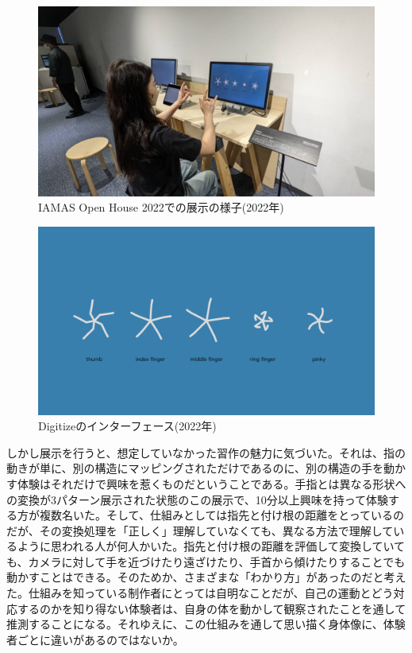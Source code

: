 \begin{figure}[H]
  \centering
  \includegraphics[width=15cm]{img/openhouse2022.jpeg}
  \caption{IAMAS Open House 2022での展示の様子(2022年)}
  \label{fig:exhibit_2022}
\end{figure}

\begin{figure}[H]
  \centering
  \includegraphics[width=15cm]{img/openhouse2022_interface.png}
  \caption{Digitizeのインターフェース(2022年)}
  \label{fig:exhibit_2022_interface}
\end{figure}

しかし展示を行うと、想定していなかった習作の魅力に気づいた。それは、指の動きが単に、別の構造にマッピングされただけであるのに、別の構造の手を動かす体験はそれだけで興味を惹くものだということである。手指とは異なる形状への変換が3パターン展示された状態のこの展示で、10分以上興味を持って体験する方が複数名いた。そして、仕組みとしては指先と付け根の距離をとっているのだが、その変換処理を「正しく」理解していなくても、異なる方法で理解しているように思われる人が何人かいた。指先と付け根の距離を評価して変換していても、カメラに対して手を近づけたり遠ざけたり、手首から傾けたりすることでも動かすことはできる。そのためか、さまざまな「わかり方」があったのだと考えた。仕組みを知っている制作者にとっては自明なことだが、自己の運動とどう対応するのかを知り得ない体験者は、自身の体を動かして観察されたことを通して推測することになる。それゆえに、この仕組みを通して思い描く身体像に、体験者ごとに違いがあるのではないか。

